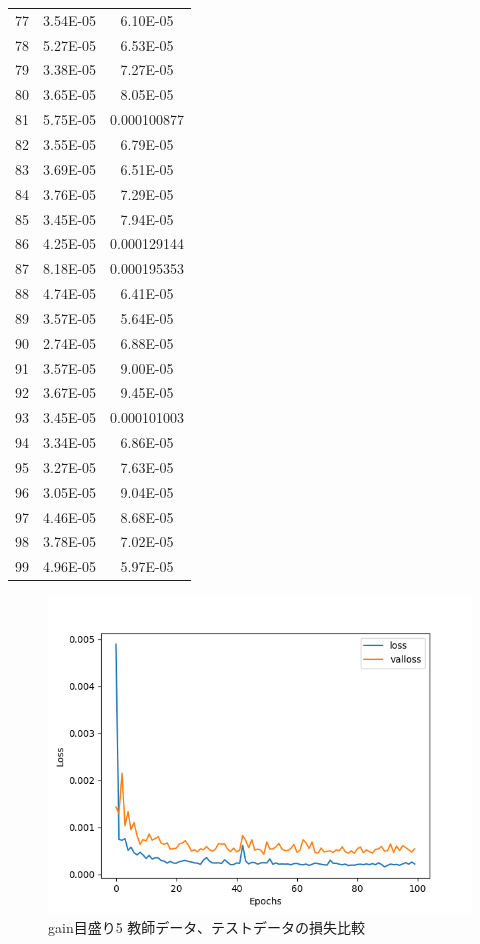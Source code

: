 \documentclass{jreport}		%
\begin{document}
\begin{table}
\begin{tabular}{c|cc}
77&3.54E-05&6.10E-05 \\
78&5.27E-05&6.53E-05 \\
79&3.38E-05&7.27E-05 \\
80&3.65E-05&8.05E-05 \\
81&5.75E-05&0.000100877 \\
82&3.55E-05&6.79E-05 \\
83&3.69E-05&6.51E-05 \\
84&3.76E-05&7.29E-05 \\
85&3.45E-05&7.94E-05 \\
86&4.25E-05&0.000129144 \\
87&8.18E-05&0.000195353 \\
88&4.74E-05&6.41E-05 \\
89&3.57E-05&5.64E-05 \\
90&2.74E-05&6.88E-05 \\
91&3.57E-05&9.00E-05 \\
92&3.67E-05&9.45E-05 \\
93&3.45E-05&0.000101003 \\
94&3.34E-05&6.86E-05 \\
95&3.27E-05&7.63E-05 \\
96&3.05E-05&9.04E-05 \\
97&4.46E-05&8.68E-05 \\
98&3.78E-05&7.02E-05 \\
99&4.96E-05&5.97E-05 \\ \hline
  \end{tabular}
\end{table}

\begin{figure}[htbp]
 \begin{center}
  \includegraphics[width=150mm]{gain5_loss_hikaku.png}
 \end{center}
 \caption{gain目盛り5 教師データ、テストデータの損失比較}
 \label{fig:one}
\end{figure}
\end{document}
